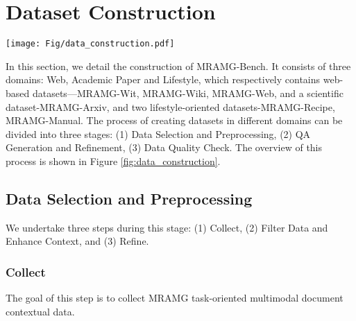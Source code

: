 \section{Dataset Construction}
\label{sec:dataset}
\begin{figure*}[t]
    \centering
    \texttt{[image: Fig/data\_construction.pdf]}
    \caption{
    The construction pipeline of MRAMG-Bench. It is divided into three stages: (1) Data Selection and Preprocessing, we collect, clean and preprocess data to ensure the quality of initial datasets. (2) QA Generation and Refinement, we formulate questions and answers and refine the formulated QA pairs. (3) Data Quality Check, we engage annotators and experts in a three-stage data quality check to ensure high-quality of the entire benchmark.
    }
    \label{fig:data_construction}
\end{figure*}
In this section, we detail the construction of MRAMG-Bench. It consists of three domains: Web, Academic Paper and Lifestyle, which respectively contains web-based datasets—MRAMG-Wit, MRAMG-Wiki, MRAMG-Web, and a scientific dataset-MRAMG-Arxiv, and two lifestyle-oriented datasets-MRAMG-Recipe, MRAMG-Manual. The process of creating datasets in different domains can be divided into three stages: (1) Data Selection and Preprocessing, (2) QA Generation and Refinement, (3) Data Quality Check. The overview of this process is shown in Figure \ref{fig:data_construction}.
\subsection{Data Selection and Preprocessing}
We undertake three steps during this stage: (1) Collect, (2) Filter Data and Enhance Context, and (3) Refine.

\subsubsection{Collect} The goal of this step is to collect MRAMG task-oriented multimodal document contextual data.
\vspace{-1mm}

